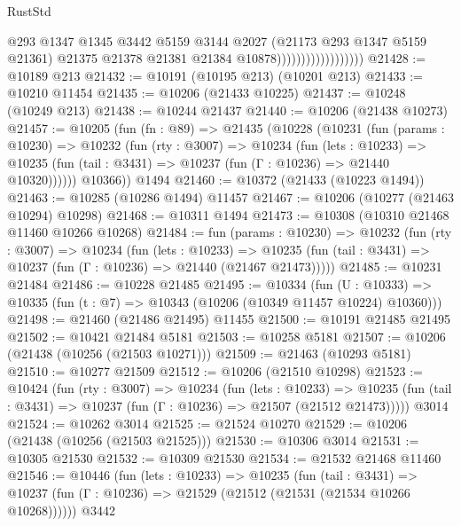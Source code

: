 \begin{lexlean}{RustStd}
\begin{coremodule}
                                        @293
                                        @1347
                                        @1345
                                        @3442
                                        @5159
                                        @3144
                                        @2027
                                        (@21173 @293 @1347 @5159 @21361)
                                        @21375
                                        @21378
                                        @21381
                                        @21384
                                        @10878))))))))))))))))))
@21428 := @10189 @213
@21432 := @10191 (@10195 @213) (@10201 @213)
@21433 := @10210 @11454
@21435 := @10206 (@21433 @10225)
@21437 := @10248 (@10249 @213)
@21438 := @10244 @21437
@21440 := @10206 (@21438 @10273)
@21457 := @10205
    (fun (fn : @89) =>
    @21435
      (@10228
        (@10231
          (fun (params : @10230) =>
          @10232
            (fun (rty : @3007) =>
            @10234
              (fun (lets : @10233) =>
              @10235 (fun (tail : @3431) => @10237 (fun (Γ : @10236) => @21440 @10320))))))
        @10366))
    @1494
@21460 := @10372 (@21433 (@10223 @1494))
@21463 := @10285 (@10286 @1494) @11457
@21467 := @10206 (@10277 (@21463 @10294) @10298)
@21468 := @10311 @1494
@21473 := @10308 (@10310 @21468 @11460 @10266 @10268)
@21484 := fun (params : @10230) =>
  @10232
    (fun (rty : @3007) =>
    @10234
      (fun (lets : @10233) =>
      @10235 (fun (tail : @3431) => @10237 (fun (Γ : @10236) => @21440 (@21467 @21473)))))
@21485 := @10231 @21484
@21486 := @10228 @21485
@21495 := @10334
    (fun (U : @10333) => @10335 (fun (t : @7) => @10343 (@10206 (@10349 @11457 @10224) @10360)))
@21498 := @21460 (@21486 @21495) @11455
@21500 := @10191 @21485 @21495
@21502 := @10421 @21484 @5181
@21503 := @10258 @5181
@21507 := @10206 (@21438 (@10256 (@21503 @10271)))
@21509 := @21463 (@10293 @5181)
@21510 := @10277 @21509
@21512 := @10206 (@21510 @10298)
@21523 := @10424
    (fun (rty : @3007) =>
    @10234
      (fun (lets : @10233) =>
      @10235 (fun (tail : @3431) => @10237 (fun (Γ : @10236) => @21507 (@21512 @21473)))))
    @3014
@21524 := @10262 @3014
@21525 := @21524 @10270
@21529 := @10206 (@21438 (@10256 (@21503 @21525)))
@21530 := @10306 @3014
@21531 := @10305 @21530
@21532 := @10309 @21530
@21534 := @21532 @21468 @11460
@21546 := @10446
    (fun (lets : @10233) =>
    @10235
      (fun (tail : @3431) =>
      @10237 (fun (Γ : @10236) => @21529 (@21512 (@21531 (@21534 @10266 @10268))))))
    @3442

\end{coremodule}
\end{lexlean}
